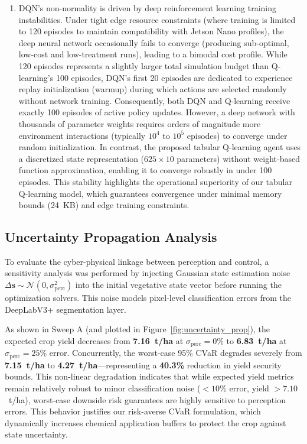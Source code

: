 \documentclass[review,3p,times,authoryear]{elsarticle}
\begin{document}
\begin{itemize}
\begin{enumerate}
        \item DQN's non-normality is driven by deep reinforcement learning training instabilities. Under tight edge resource constraints (where training is limited to 120 episodes to maintain compatibility with Jetson Nano profiles), the deep neural network occasionally fails to converge (producing sub-optimal, low-cost and low-treatment runs), leading to a bimodal cost profile. While 120 episodes represents a slightly larger total simulation budget than Q-learning's 100 episodes, DQN's first 20 episodes are dedicated to experience replay initialization (warmup) during which actions are selected randomly without network training. Consequently, both DQN and Q-learning receive exactly 100 episodes of active policy updates. However, a deep network with thousands of parameter weights requires orders of magnitude more environment interactions (typically $10^4$ to $10^5$ episodes) to converge under random initialization. In contrast, the proposed tabular Q-learning agent uses a discretized state representation ($625 \times 10$ parameters) without weight-based function approximation, enabling it to converge robustly in under 100 episodes. This stability highlights the operational superiority of our tabular Q-learning model, which guarantees convergence under minimal memory bounds (24~KB) and edge training constraints.
    \end{enumerate}
\end{itemize}

\subsection{Uncertainty Propagation Analysis}
To evaluate the cyber-physical linkage between perception and control, a sensitivity analysis was performed by injecting Gaussian state estimation noise $\Delta \mathbf{s} \sim \mathcal{N}(0, \sigma_\text{perc}^2)$ into the initial vegetative state vector before running the optimization solvers. This noise models pixel-level classification errors from the DeepLabV3+ segmentation layer. 

As shown in Sweep A (and plotted in Figure~\ref{fig:uncertainty_prop}), the expected crop yield decreases from \textbf{7.16~t/ha} at $\sigma_\text{perc}=0\%$ to \textbf{6.83~t/ha} at $\sigma_\text{perc}=25\%$ error. Concurrently, the worst-case 95\% CVaR degrades severely from \textbf{7.15~t/ha} to \textbf{4.27~t/ha}---representing a \textbf{40.3\%} reduction in yield security bounds. This non-linear degradation indicates that while expected yield metrics remain relatively robust to minor classification noise ($<10\%$ error, yield $>7.10$~t/ha), worst-case downside risk guarantees are highly sensitive to perception errors. This behavior justifies our risk-averse CVaR formulation, which dynamically increases chemical application buffers to protect the crop against state uncertainty.
\end{document}
